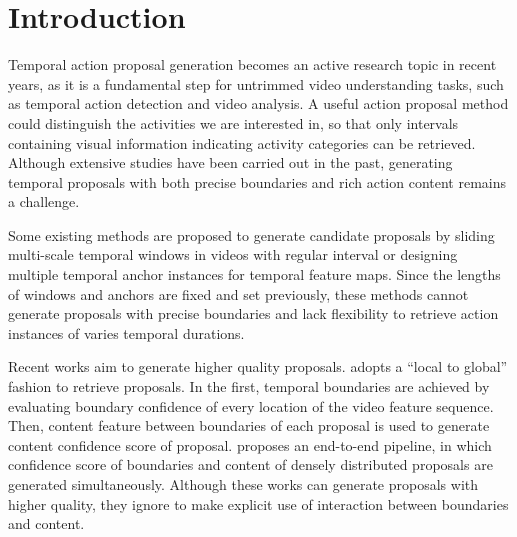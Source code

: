\documentclass[runningheads]{llncs}
\begin{document}
\section{Introduction}
Temporal action proposal generation becomes an active research topic in recent years, as it is a fundamental step for untrimmed video understanding tasks, such as temporal action detection and video analysis. A useful action proposal method could distinguish the activities we are interested in, so that only intervals containing visual information indicating activity categories can be retrieved. Although extensive studies have been carried out in the past, generating temporal proposals with both precise boundaries and rich action content remains a challenge\cite{wang2014action,oneata2014lear,SST,sw2,sw3,SSAD,BSN,BMN}.

Some existing methods \cite{wang2014action,oneata2014lear,SST,sw2,sw3,SSAD} are proposed to generate candidate proposals by sliding multi-scale temporal windows in videos with regular interval or designing multiple temporal anchor instances for temporal feature maps. Since the lengths of windows and anchors are fixed and set previously, these methods cannot generate proposals with precise boundaries and lack flexibility to retrieve action instances of varies temporal durations.

Recent works \cite{BSN,BMN} aim to generate higher quality proposals. \cite{BSN} adopts a ``local to global'' fashion to retrieve proposals. In the first, temporal boundaries are achieved by evaluating boundary confidence of every location of the video feature sequence. Then, content feature between boundaries of each proposal is used to generate content confidence score of proposal. \cite{BMN} proposes an end-to-end pipeline, in which confidence score of boundaries and content of densely distributed proposals are generated simultaneously. Although these works can generate proposals with higher quality, they ignore to make explicit use of interaction between boundaries and content.
\end{document}
